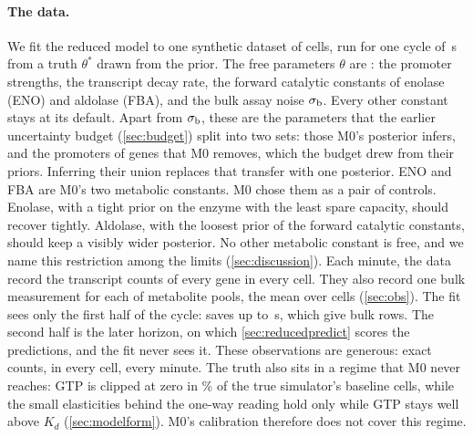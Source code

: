 \paragraph{The data.} We fit the reduced model to one synthetic dataset of
 cells, run for one cycle of \,s from a truth $\theta^\ast$
drawn from the prior. The free parameters $\theta$ are : the
 promoter strengths, the transcript decay rate, the forward catalytic
constants of enolase (ENO) and aldolase (FBA), and the bulk assay noise $\sigma_{\mathrm{b}}$. Every other
constant stays at its default. Apart from $\sigma_{\mathrm{b}}$, these are the parameters that the earlier
uncertainty budget (\cref{sec:budget}) split into two sets: those M0's posterior infers, and
the  promoters of genes that M0 removes, which the budget drew from their priors.
Inferring their union replaces that transfer with one posterior. ENO and FBA are M0's two
metabolic constants. M0 chose them as a pair of controls. Enolase, with a tight prior on the
enzyme with the least spare capacity, should recover tightly. Aldolase, with the loosest prior
of the forward catalytic constants, should keep a visibly wider posterior. No other metabolic constant is free, and we name this
restriction among the limits (\cref{sec:discussion}). Each minute, the data record the transcript counts of every
gene in every cell. They also record one bulk measurement for each of 
metabolite pools, the mean over cells (\cref{sec:obs}). The fit sees only the first half of the
cycle:  saves up to \,s, which give  bulk
rows. The second half is the later horizon, on which \cref{sec:reducedpredict} scores the
predictions, and the fit never sees it. These observations are generous: exact counts, in
every cell, every minute. The truth also sits in a regime that M0 never reaches: GTP is
clipped at zero in \% of the true simulator's baseline cells, while the
small elasticities behind the one-way reading hold only while GTP stays well above $K_d$
(\cref{sec:modelform}). M0's calibration therefore does not cover this regime.

